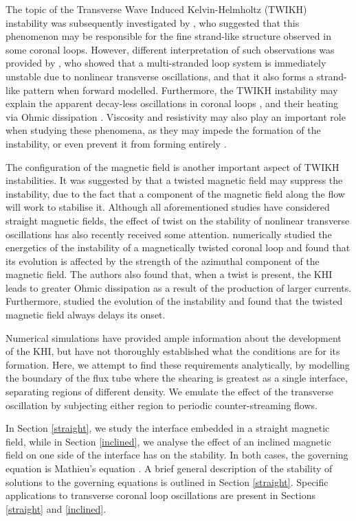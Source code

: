 \documentclass[12pt]{ociamthesis}
\begin{document}
The topic of the Transverse Wave Induced Kelvin-Helmholtz (TWIKH) instability was subsequently investigated by \cite{Antolin2014}, who suggested that this phenomenon may be responsible for the fine strand-like structure observed in some coronal loops.
However, different interpretation of such observations was provided by \cite{Magyar2016b}, who showed that a multi-stranded loop system is immediately unstable due to nonlinear transverse oscillations, and that it also forms a strand-like pattern when forward modelled.
Furthermore, the TWIKH instability may explain the apparent decay-less oscillations in coronal loops \citep{Antolin2016}, and their heating via Ohmic dissipation \citep{Karampelas2017, Howson2017b}.
Viscosity and resistivity may also play an important role when studying these phenomena, as they may impede the formation of the instability, or even prevent it from forming entirely \citep{Howson2017a}.

The configuration of the magnetic field is another important aspect of TWIKH instabilities.
It was suggested by \cite{Terradas2008} that a twisted magnetic field may suppress the instability, due to the fact that a component of the magnetic field along the flow will work to stabilise it.
Although all aforementioned studies have considered straight magnetic fields, the effect of twist on the stability of nonlinear transverse oscillations has also recently received some attention.
\cite{Howson2017b} numerically studied the energetics of the instability of a magnetically twisted coronal loop and found that its evolution is affected by the strength of the azimuthal component of the magnetic field.
The authors also found that, when a twist is present, the KHI leads to greater Ohmic dissipation as a result of the production of larger currents.
Furthermore, \cite{Terradas2018} studied the evolution of the instability and found that the twisted magnetic field always delays its onset.

Numerical simulations have provided ample information about the development of the KHI, but have not thoroughly established what the conditions are for its formation.
Here, we attempt to find these requirements analytically, by modelling the boundary of the flux tube where the shearing is greatest as a single interface, separating regions of different density.
We emulate the effect of the transverse oscillation by subjecting either region to periodic counter-streaming flows.

In Section \ref{straight}, we study the interface embedded in a straight magnetic field, while in Section \ref{inclined}, we analyse the effect of an inclined magnetic field on one side of the interface has on the stability.
In both cases, the governing equation is Mathieu's equation \citep{McLachlan1946}.
A brief general description of the stability of solutions to the governing equations is outlined in Section \ref{straight}.
Specific applications to transverse coronal loop oscillations are present in Sections \ref{straight} and \ref{inclined}.
\end{document}

